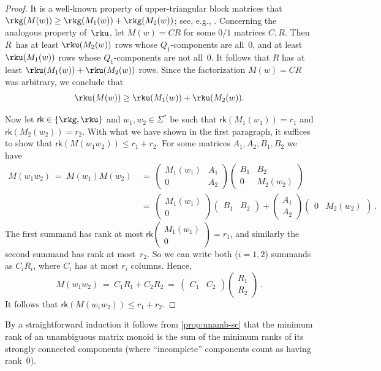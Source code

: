 \begin{proof}
It is a well-known property of upper-triangular block matrices that $\rkg(M(w)) \ge \rkg(M_1(w)) + \rkg(M_2(w))$; see, e.g., \cite[Chapter 0.9.4]{HornJohnson13}.
Concerning the analogous property of~$\rku$, let $M(w) = C R$ for some $0/1$ matrices $C, R$.
Then $R$~has at least $\rku(M_2(w))$ rows whose $Q_1$-components are all~$0$, and at least $\rku(M_1(w))$ rows whose $Q_1$-components are not all~$0$.
It follows that $R$ has at least $\rku(M_1(w)) + \rku(M_2(w))$ rows.
Since the factorization $M(w) = C R$ was arbitrary, we conclude that \[\rku(M(w)) \ge \rku(M_1(w)) + \rku(M_2(w)).\]

\newcommand{\myrank}{\mathsf{rk}}
Now let $\myrank \in \{\rkg, \rku\}$ and $w_1, w_2 \in \Sigma^*$ be such that $\myrank(M_1(w_1)) = r_1$ and $\myrank(M_2(w_2)) = r_2$.
With what we have shown in the first paragraph, it suffices to show that $\myrank(M(w_1 w_2)) \le r_1 + r_2$.
For some matrices $A_1, A_2, B_1, B_2$ we have
\begin{align*}
M(w_1 w_2) \ = \ M(w_1) M(w_2) \ &= \ 
\begin{pmatrix}
    M_1(w_1) & A_1 \\ 0 & A_2
\end{pmatrix}
\begin{pmatrix}
    B_1 & B_2 \\ 0 & M_2(w_2)
\end{pmatrix} \\
&= \ 
\begin{pmatrix}
    M_1(w_1) \\ 0 
\end{pmatrix}
\begin{pmatrix}
    B_1 & B_2 
\end{pmatrix}
+
\begin{pmatrix}
    A_1 \\ A_2
\end{pmatrix}
\begin{pmatrix}
   0 & M_2(w_2)
\end{pmatrix}\,.
\end{align*}
The first summand has rank at most $\myrank \begin{pmatrix}
    M_1(w_1) \\ 0 
\end{pmatrix} = r_1$, and similarly the second summand has rank at most~$r_2$.
So we can write both ($i=1,2$) summands as $C_i R_i$, where $C_i$ has at most $r_i$ columns.
Hence, 
\[
M(w_1 w_2) \ = \ C_1 R_1 + C_2 R_2 \ = \ 
\begin{pmatrix}
    C_1 & C_2 
\end{pmatrix}
\begin{pmatrix}
    R_1 \\ R_2
\end{pmatrix}\,.
\]
It follows that $\myrank(M(w_1 w_2)) \le r_1+r_2$.
\end{proof}

\noindent
By a straightforward induction it follows from \autoref{prop:unamb-sc} that the minimum rank of an unambiguous matrix monoid is the sum of the minimum ranks of its strongly connected components (where ``incomplete'' components count as having rank~$0$).


